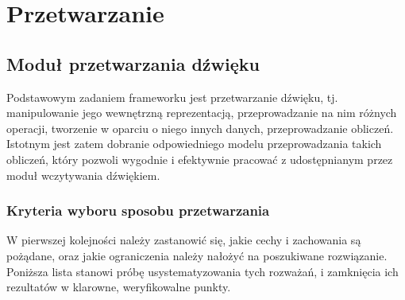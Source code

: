 \chapter{Przetwarzanie}
\section{Moduł przetwarzania dźwięku}

Podstawowym zadaniem frameworku jest przetwarzanie dźwięku, tj. manipulowanie jego wewnętrzną
reprezentacją, przeprowadzanie na nim różnych operacji, tworzenie w oparciu o niego innych danych,
przeprowadzanie obliczeń. Istotnym jest zatem dobranie odpowiedniego modelu przeprowadzania takich
obliczeń, który pozwoli wygodnie i efektywnie pracować z udostępnianym przez moduł wczytywania
dźwiękiem.


\subsection{Kryteria wyboru sposobu przetwarzania}

W pierwszej kolejności należy zastanowić się, jakie cechy i zachowania są pożądane, oraz jakie
ograniczenia należy nałożyć na poszukiwane rozwiązanie. Poniższa lista stanowi próbę
usystematyzowania tych rozważań, i zamknięcia ich rezultatów w klarowne, weryfikowalne punkty.

